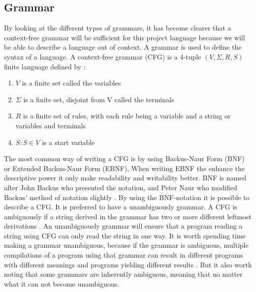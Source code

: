 \subsection{Grammar}
\label{sec:grammar}
By looking at the different types of grammars, it has become clearer that a context-free grammar will be sufficient for this project language because we will be able to describe a language out of context. A grammar is used to define the syntax of a language. A context-free grammar (CFG) is a 4-tuple $(V, \Sigma, R, S)$ finite language defined by \citep{sipser}:
\begin{enumerate}
	\item $V$ is a finite set called the variables
	\item $\Sigma$ is a finite set, disjoint from V called the terminals
	\item $R$ is a finite set of rules, with each rule being a variable and a string or variables and terminals
	\item $S: S \in V$ is a start variable
\end{enumerate}

The most common way of writing a CFG is by using Backus-Naur Form (BNF) or Extended Backus-Naur Form (EBNF), %
When writing EBNF the enhance the descriptive power it only make readability and writability better\citep{sebesta}. %
BNF is named after John Backus who presented the notation, and Peter Naur who modified Backus' method of notation slightly \citep{sebesta}. By using the BNF-notation it is possible to describe a CFG. It is preferred to have a unambiguously grammar. A CFG is ambiguously if a string derived in the grammar has two or more different leftmost derivations \citep{sipser}. An unambiguously grammar will ensure that a program reading a string using CFG can only read the string in one way.
It is worth spending time making a grammar unambiguous, because if the grammar is ambiguous, multiple compilations of a program using that grammar can result in different programs with different meanings and programs yielding different results \citep{sebesta}. But it also worth noting that some grammars are inherently ambiguous, meaning that no matter what it can not become unambiguous.


